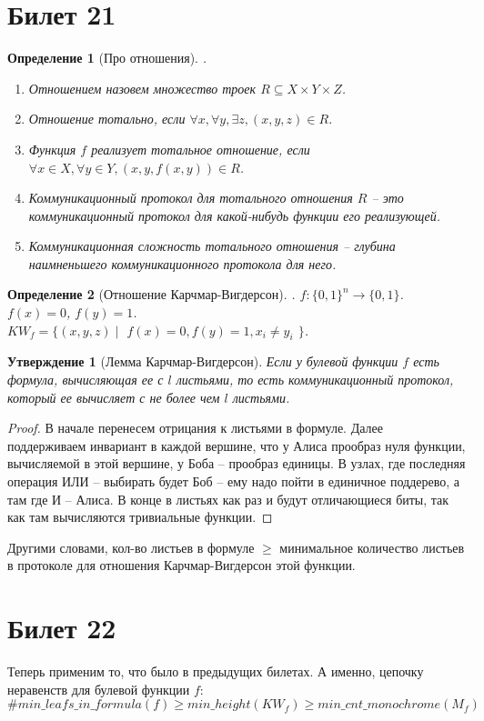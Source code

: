 \documentclass[12pt, letterpaper]{article}
\newtheorem{prop}{Утверждение}[section]
\newtheorem{defi}{Определение}[section]
\begin{document}
\section{Билет 21}
\begin{defi}[Про отношения].
\begin{enumerate}
\item Отношением назовем множество троек $R \subseteq X \times Y \times Z$.
\item Отношение тотально, если $\forall x, \forall y, \exists z, (x,y,z) \in R$.
\item Функция $f$ реализует тотальное отношение, если $\forall x \in X, \forall y \in Y, (x,y,f(x,y)) \in R$.
\item Коммуникационный протокол для тотального отношения $R$ -- это коммуникационный протокол для какой-нибудь функции его реализующей.
\item Коммуникационная сложность тотального отношения -- глубина наимненьшего коммуникационного протокола для него.
\end{enumerate}
\end{defi}

\begin{defi}[Отношение Карчмар-Вигдерсон].
$f : \{0,1\}^n \rightarrow \{0, 1\}$. $f(x) = 0$, $f(y) = 1$. \\
$KW_f = \{ (x,y,z)\;|\;$ $f(x)=0, f(y)=1, x_i \neq y_i$ $\}$.
\end{defi}
\begin{prop}[Лемма Карчмар-Вигдерсон]
Если у булевой функции $f$ есть формула, вычисляющая ее с $l$ листьями, то есть коммуникационный протокол, который ее вычисляет с не более чем $l$ листьями. 
\end{prop}
\begin{proof}
В начале перенесем отрицания к листьями в формуле. Далее поддерживаем инвариант в каждой вершине, что у Алиса прообраз нуля функции, вычисляемой в этой вершине, у Боба -- прообраз единицы. В узлах, где последняя операция ИЛИ -- выбирать будет Боб -- ему надо пойти в единичное поддерево, а там где И -- Алиса. В конце в листьях как раз и будут отличающиеся биты, так как там вычисляются тривиальные функции.
\end{proof}
Другими словами, кол-во листьев в формуле $\geq$ минимальное количество листьев в протоколе для отношения Карчмар-Вигдерсон этой функции.

\section{Билет 22}
Теперь применим то, что было в предыдущих билетах. А именно, цепочку неравенств для булевой функции $f$:
$$\#min\_leafs\_in\_formula(f) \geq min\_height(KW_f) \geq min\_cnt\_monochrome(M_f)$$
\end{document}
